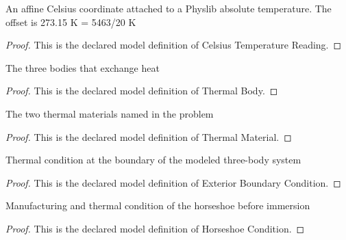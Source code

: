 \begin{definition}
  \label{def:physics:phyx-mini-0485:phyxminiproblems-problemphyxmini0485-celsiustemperaturereading}
  An affine Celsius coordinate attached to a Physlib absolute temperature. The offset is 273.15 K = 5463/20 K
\end{definition}
\begin{proof}
  This is the declared model definition of Celsius Temperature Reading.
\end{proof}
\begin{definition}
  \label{def:physics:phyx-mini-0485:phyxminiproblems-problemphyxmini0485-thermalbody}
  The three bodies that exchange heat
\end{definition}
\begin{proof}
  This is the declared model definition of Thermal Body.
\end{proof}
\begin{definition}
  \label{def:physics:phyx-mini-0485:phyxminiproblems-problemphyxmini0485-thermalmaterial}
  The two thermal materials named in the problem
\end{definition}
\begin{proof}
  This is the declared model definition of Thermal Material.
\end{proof}
\begin{definition}
  \label{def:physics:phyx-mini-0485:phyxminiproblems-problemphyxmini0485-exteriorboundarycondition}
  Thermal condition at the boundary of the modeled three-body system
\end{definition}
\begin{proof}
  This is the declared model definition of Exterior Boundary Condition.
\end{proof}
\begin{definition}
  \label{def:physics:phyx-mini-0485:phyxminiproblems-problemphyxmini0485-horseshoecondition}
  Manufacturing and thermal condition of the horseshoe before immersion
\end{definition}
\begin{proof}
  This is the declared model definition of Horseshoe Condition.
\end{proof}
